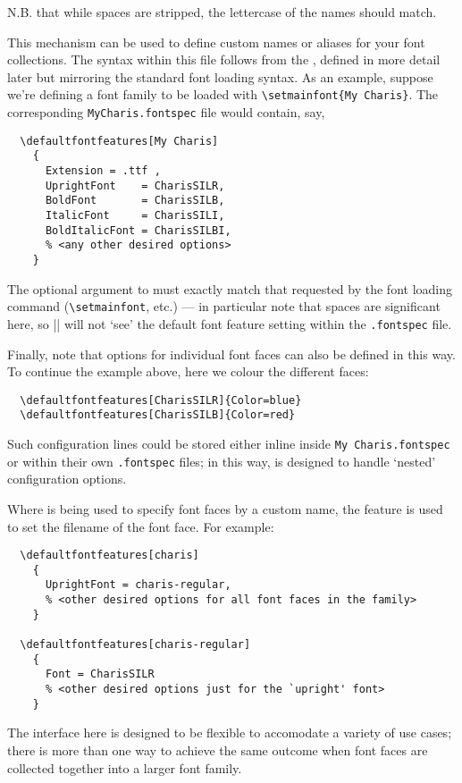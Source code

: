\documentclass[a4paper]{l3doc}
\begin{document}
N.B. that while spaces are stripped, the lettercase of the names should match.

This mechanism can be used to define custom names or aliases for your font collections.
The syntax within this file follows from the , defined in more detail later but mirroring the standard  font loading syntax.
As an example, suppose we're defining a font family to be loaded with \verb|\setmainfont{My Charis}|.
The corresponding \texttt{MyCharis.fontspec} file would contain, say,
\begin{Verbatim}
  \defaultfontfeatures[My Charis]
    {
      Extension = .ttf ,
      UprightFont    = CharisSILR,
      BoldFont       = CharisSILB,
      ItalicFont     = CharisSILI,
      BoldItalicFont = CharisSILBI,
      % <any other desired options>
    }
\end{Verbatim}
The optional argument to  must exactly match that requested by the font loading command (\verb|\setmainfont|, etc.) --- in particular note that spaces are significant here, so |\setmainfont{MyCharis}| will not `see' the default font feature setting within the \texttt{.fontspec} file.

Finally, note that options for individual font faces can also be defined in this way.
To continue the example above, here we colour the different faces:
\begin{Verbatim}
  \defaultfontfeatures[CharisSILR]{Color=blue}
  \defaultfontfeatures[CharisSILB]{Color=red}
\end{Verbatim}
Such configuration lines could be stored either inline inside \texttt{My Charis.fontspec}
or within their own \texttt{.fontspec} files; in this way,  is designed to
handle `nested' configuration options.

Where  is being used to specify font faces by a custom name,
the  feature is used to set the filename of the font face. For example:
\begin{Verbatim}
  \defaultfontfeatures[charis]
    {
      UprightFont = charis-regular,
      % <other desired options for all font faces in the family>
    }

  \defaultfontfeatures[charis-regular]
    {
      Font = CharisSILR
      % <other desired options just for the `upright' font>
    }
\end{Verbatim}
The  interface here is designed to be flexible to accomodate a variety
of use cases; there is more than one way to achieve the same outcome when font faces are
collected together into a larger font family.
\end{document}
